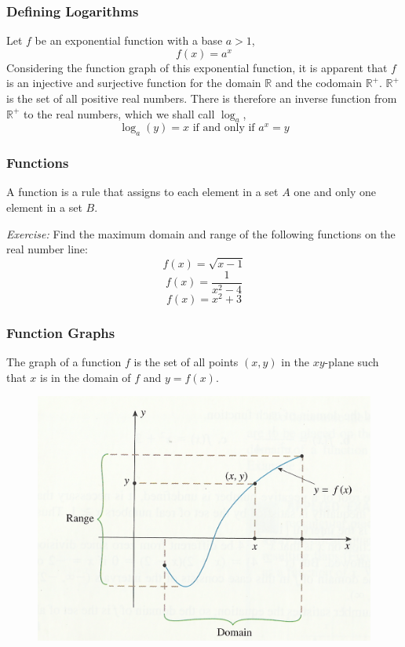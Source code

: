 \documentclass[xcolor=dvipsnames]{beamer}
\begin{document}
\begin{frame}
  \frametitle{Defining Logarithms}
Let $f$ be an exponential function with a base $a>1$,
\begin{equation}
  \label{eq:ohzuiwah}
  f(x)=a^{x}
\end{equation}
Considering the function graph of this exponential function, it is
apparent that $f$ is an injective and surjective function for the
domain $\mathbb{R}$ and the codomain $\mathbb{R}^{+}$.
$\mathbb{R}^{+}$ is the set of all positive real numbers. There is
therefore an inverse function from $\mathbb{R}^{+}$ to the real
numbers, which we shall call $\log_{a}$,
\begin{equation}
  \label{eq:cievucha}
  \log_{a}(y)=x\mbox{ if and only if }a^{x}=y
\end{equation}
\end{frame}

\begin{frame}
  \frametitle{Functions}
A \alert{function} is a rule that assigns to each element in a set $A$ one and
only one element in a set $B$.

\medskip

\emph{Exercise:} Find the maximum domain and range of the following
functions on the real number line:
\begin{equation}
  \label{eq:sijoomai}
  f(x)=\sqrt{x-1}
\end{equation}
\begin{equation}
  \label{eq:vooghahk}
  f(x)=\frac{1}{x^{2}-4}
\end{equation}
\begin{equation}
  \label{eq:zaekohxi}
  f(x)=x^{2}+3
\end{equation}
\end{frame}

\begin{frame}
  \frametitle{Function Graphs}
The \alert{graph of a function} $f$ is the set of all points $(x,y)$
in the $xy$-plane such that $x$ is in the domain of $f$ and $y=f(x)$.
  \begin{figure}[h]
    \includegraphics[scale=1]{./fgraph-02.png}
  \end{figure}
\end{frame}
\end{document}
